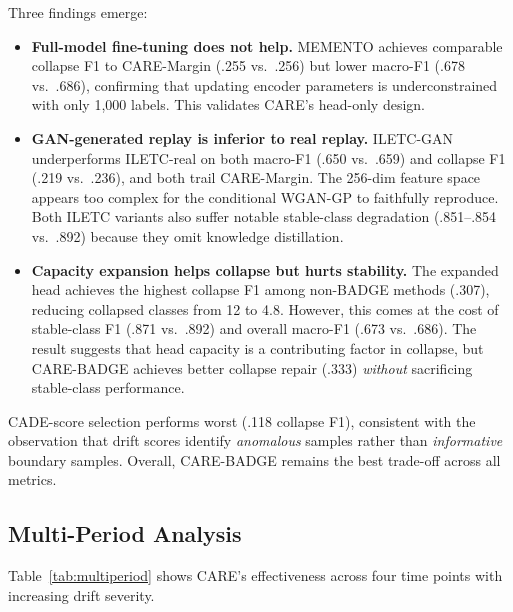 \documentclass[journal]{IEEEtran}
\newcommand{\ours}{CARE}  %
\begin{document}
Three findings emerge:
\begin{itemize}
  \item \textbf{Full-model fine-tuning does not help.} MEMENTO achieves comparable collapse F1 to \ours{}-Margin (.255 vs.\ .256) but lower macro-F1 (.678 vs.\ .686), confirming that updating encoder parameters is underconstrained with only 1{,}000 labels. This validates \ours{}'s head-only design.
  \item \textbf{GAN-generated replay is inferior to real replay.} ILETC-GAN underperforms ILETC-real on both macro-F1 (.650 vs.\ .659) and collapse F1 (.219 vs.\ .236), and both trail \ours{}-Margin. The 256-dim feature space appears too complex for the conditional WGAN-GP to faithfully reproduce. Both ILETC variants also suffer notable stable-class degradation (.851--.854 vs.\ .892) because they omit knowledge distillation.
  \item \textbf{Capacity expansion helps collapse but hurts stability.} The expanded head achieves the highest collapse F1 among non-BADGE methods (.307), reducing collapsed classes from 12 to 4.8. However, this comes at the cost of stable-class F1 (.871 vs.\ .892) and overall macro-F1 (.673 vs.\ .686). The result suggests that head capacity is a contributing factor in collapse, but \ours{}-BADGE achieves better collapse repair (.333) \textit{without} sacrificing stable-class performance.
\end{itemize}

CADE-score selection performs worst (.118 collapse F1), consistent with the observation that drift scores identify \textit{anomalous} samples rather than \textit{informative} boundary samples. Overall, \ours{}-BADGE remains the best trade-off across all metrics.

\subsection{Multi-Period Analysis}
\label{sec:multi_period}

Table~\ref{tab:multiperiod} shows \ours{}'s effectiveness across four time points with increasing drift severity.
\end{document}
